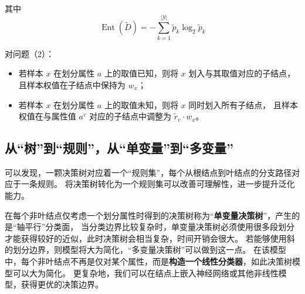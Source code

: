 其中
\begin{equation}
    \operatorname{Ent}(\tilde{D}) = -\sum\limits_{k=1}^{|\mathcal Y|}{\tilde{p}_k \log_2 \tilde{p}_k}
\end{equation}

对问题（2）：

\begin{itemize}
    \item 若样本 $x$ 在划分属性 $a$ 上的取值已知，则将 $x$ 划入与其取值对应的子结点，且样本权值在子结点中保持为 $w_x$；
    \item 若样本 $x$ 在划分属性 $a$ 上的取值未知，则将 $x$ 同时划入所有子结点，
    且样本权值在与属性值 $a^v$ 对应的子结点中调整为 $\tilde{r}_v \cdot w_x$。
\end{itemize}

\subsection{从“树”到“规则”，从“单变量”到“多变量”}

可以发现，一颗决策树对应着一个“规则集”，每个从根结点到叶结点的分支路径对应于一条规则。
将决策树转化为一个规则集可以改善可理解性，进一步提升泛化能力。

在每个非叶结点仅考虑一个划分属性时得到的决策树称为“\textbf{单变量决策树}”，产生的是“轴平行”分类面，
当分类边界比较复杂时，单变量决策树必须使用很多段划分才能获得较好的近似，此时决策树会相当复杂，时间开销会很大。
若能够使用斜的划分边界，则模型将大为简化，“多变量决策树”可以做到这一点。
在该模型中，每个非叶结点不再是仅对某个属性，而是\textbf{构造一个线性分类器}，如此决策树模型可以大为简化。
更复杂地，我们可以在结点上嵌入神经网络或其他非线性模型，获得更优的决策边界。